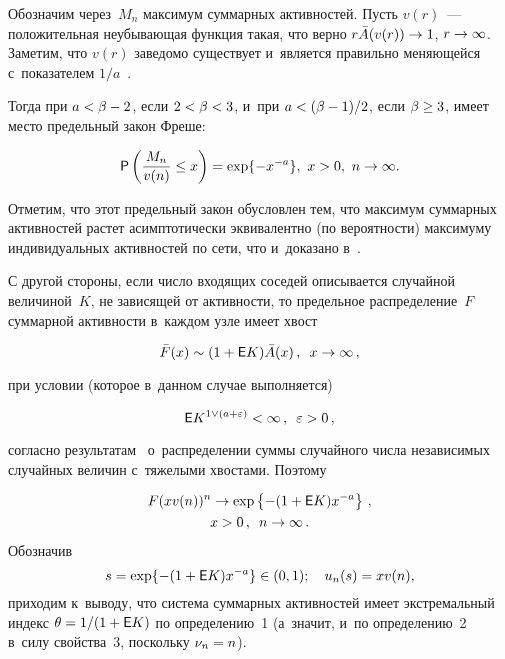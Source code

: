 \begin{multicols}{2}
Обозначим через~$M_n$ максимум суммарных активностей. Пусть
$v(r)$~--- положительная неубывающая
функция такая, что верно $r{\bar A}(v(r))\hm\to 1$, $r\hm\to\infty$.
Заметим, что $v(r)$ заведомо существует
и~является правильно меняющейся с~показателем $1/a$~\cite[\S 1.5]{Sen}.

Тогда при $a<\beta\hm-2$, если $2\hm<\beta\hm<3$, и~при
$a\hm<(\beta-1)/2$, если $\beta\hm\ge 3$,
имеет место предельный закон Фреше:

\vspace*{3pt}

\noindent
$$
{\sf P}\left(\displaystyle\frac{\displaystyle M_n\mathstrut}{\displaystyle v(n)\mathstrut}\le x\right)=\exp\{-x^{-a}\},\ x>0,\ n\to\infty.
$$ 

\vspace*{-2pt}

\noindent
Отметим,
что этот предельный закон обусловлен тем, что максимум суммарных активностей
растет асимптотически эквивалентно (по ве\-ро\-ят\-ности) максимуму индивидуальных
активностей по сети, что и~доказано в~\cite[теорема~1]{Leb4}.

С другой стороны, если число
входящих соседей описывается случайной величиной~$K$, не зависящей от активности,
то предельное распределение~$F$ суммарной активности в~каждом узле имеет хвост

\vspace*{3pt}

\noindent
$$
{\bar F}(x)\sim (1+{\sf E}K){\bar A}(x)\,,\enskip x\to\infty\,,
$$

\vspace*{-2pt}

\noindent
при условии (которое в~данном случае выпол\-ня\-ется)

\vspace*{3pt}

\noindent
$$
{\sf E}K^{1\vee (a+\varepsilon)}<\infty\,,\enskip \varepsilon>0\,,
$$

\vspace*{-2pt}

\noindent
согласно результатам~\cite{Stam} о~распределении суммы случайного числа независимых
случайных величин с~тяжелыми хвостами. Поэтому

\vspace*{-3pt}

\noindent
\begin{multline*}
F(xv(n))^n\to\exp\left\{-(1+{\sf E}K)x^{-a}\right\}\,,\\ x>0\,,\enskip n\to\infty\,.
\end{multline*}
Обозначив 
$$
s=\exp\{-(1+{\sf E}K)x^{-a}\}\in (0,1);\quad  
u_n(s)=xv(n),
$$
приходим к~выводу, что система
суммарных активностей имеет экстремальный индекс $\theta\hm=1/(1\hm+{\sf E}K)$
по определению~1
(а~значит, и~по определению~2 в~силу свойства~3, поскольку $\nu_n\hm=n$).


\end{multicols}
